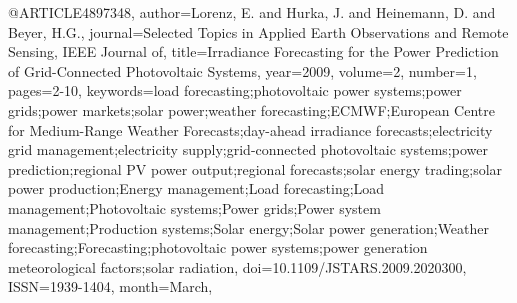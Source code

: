 @ARTICLE{4897348, 
author={Lorenz, E. and Hurka, J. and Heinemann, D. and Beyer, H.G.}, 
journal={Selected Topics in Applied Earth Observations and Remote Sensing, IEEE Journal of}, 
title={Irradiance Forecasting for the Power Prediction of Grid-Connected Photovoltaic Systems}, 
year={2009}, 
volume={2}, 
number={1}, 
pages={2-10}, 
keywords={load forecasting;photovoltaic power systems;power grids;power markets;solar power;weather forecasting;ECMWF;European Centre for Medium-Range Weather Forecasts;day-ahead irradiance forecasts;electricity grid management;electricity supply;grid-connected photovoltaic systems;power prediction;regional PV power output;regional forecasts;solar energy trading;solar power production;Energy management;Load forecasting;Load management;Photovoltaic systems;Power grids;Power system management;Production systems;Solar energy;Solar power generation;Weather forecasting;Forecasting;photovoltaic power systems;power generation meteorological factors;solar radiation}, 
doi={10.1109/JSTARS.2009.2020300}, 
ISSN={1939-1404}, 
month={March},}

